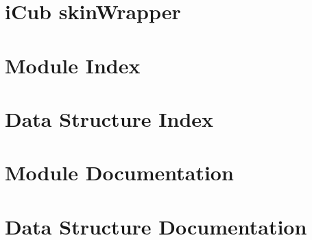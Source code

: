 \documentclass[twoside]{book}
\newcommand{\+}{\discretionary{\mbox{\scriptsize$\hookleftarrow$}}{}{}}
\newcommand{\clearemptydoublepage}{%
  \newpage{\pagestyle{empty}\cleardoublepage}%
}
\begin{document}
\chapter{i\+Cub skin\+Wrapper}
\label{md_C_1_dev_icub-tests_src_skinWrapperTest_README}

\chapter{Module Index}

\chapter{Data Structure Index}

\chapter{Module Documentation}

\chapter{Data Structure Documentation}





















\backmatter
\newpage
{}
\clearemptydoublepage
{}
\printindex
\end{document}
